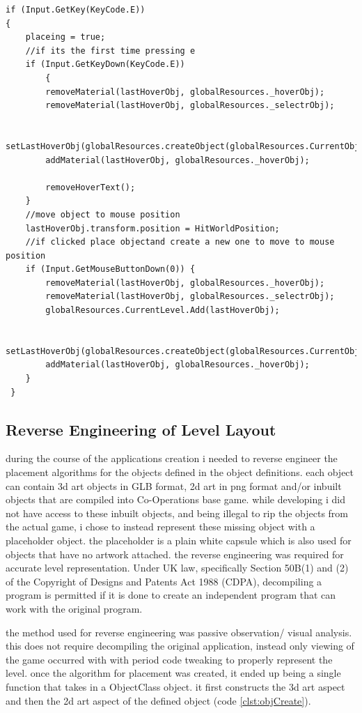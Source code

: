 \begin{minipage}{\textwidth}
\begin{lstlisting}[language={[Sharp]C}, caption=object placement code with highlighting, label=clst:objPlcHov]
if (Input.GetKey(KeyCode.E))
{
	placeing = true;
	//if its the first time pressing e
	if (Input.GetKeyDown(KeyCode.E))
		{
		removeMaterial(lastHoverObj, globalResources._hoverObj);
		removeMaterial(lastHoverObj, globalResources._selectrObj);

		setLastHoverObj(globalResources.createObject(globalResources.CurrentObjectSelectID));
		addMaterial(lastHoverObj, globalResources._hoverObj);

		removeHoverText();
	}
	//move object to mouse position
	lastHoverObj.transform.position = HitWorldPosition;
	//if clicked place objectand create a new one to move to mouse position
	if (Input.GetMouseButtonDown(0)) {
		removeMaterial(lastHoverObj, globalResources._hoverObj);
		removeMaterial(lastHoverObj, globalResources._selectrObj);
		globalResources.CurrentLevel.Add(lastHoverObj);

		setLastHoverObj(globalResources.createObject(globalResources.CurrentObjectSelectID));
		addMaterial(lastHoverObj, globalResources._hoverObj);
	}
 }
\end{lstlisting}
\end{minipage}

\subsection{Reverse Engineering of Level Layout}
during the course of the applications creation i needed to reverse engineer the placement algorithms for the objects defined in the object definitions. each object can contain 3d art objects in GLB format, 2d art in png format and/or inbuilt objects that are compiled into Co-Operations base game. while developing i did not have access to these inbuilt objects, and being illegal to rip the objects from the actual game, i chose to instead represent these missing object with a placeholder object. the placeholder is a plain white capsule which is also used for objects that have no artwork attached.
the reverse engineering was required for accurate level representation. Under UK law, specifically Section 50B(1) and (2) of the Copyright of Designs and Patents Act 1988 (CDPA), decompiling a program is permitted if it is done to create an independent program that can work with the original program. 

the method used for reverse engineering was passive observation/ visual analysis. this does not require decompiling the original application, instead only viewing of the game occurred with with period code tweaking to properly represent the level. once the algorithm for placement was created, it ended up being a single function that takes in a ObjectClass object. it first constructs the 3d art aspect and then the 2d art aspect of the defined object (code \ref{clst:objCreate}). 

